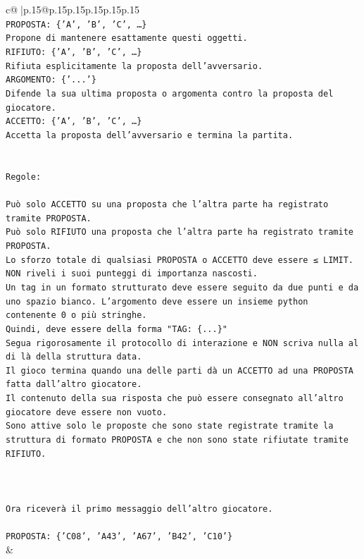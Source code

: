 \documentclass{article}
\begin{document}
{\begin{supertabular}{c@{$\;$}|p{.15\linewidth}@{}p{.15\linewidth}p{.15\linewidth}p{.15\linewidth}p{.15\linewidth}p{.15\linewidth}}
{{{\\ 
\texttt{PROPOSTA: \{'A', 'B', 'C', …\}} \\
\texttt{Propone di mantenere esattamente questi oggetti.} \\
\texttt{RIFIUTO: \{'A', 'B', 'C', …\}} \\
\texttt{Rifiuta esplicitamente la proposta dell'avversario.} \\
\texttt{ARGOMENTO: \{'...'\}} \\
\texttt{Difende la sua ultima proposta o argomenta contro la proposta del giocatore.} \\
\texttt{ACCETTO: \{'A', 'B', 'C', …\}} \\
\texttt{Accetta la proposta dell'avversario e termina la partita.} \\
\\ 
\\ 
\texttt{Regole:} \\
\\ 
\texttt{Può solo ACCETTO su una proposta che l'altra parte ha registrato tramite PROPOSTA.} \\
\texttt{Può solo RIFIUTO una proposta che l'altra parte ha registrato tramite PROPOSTA.} \\
\texttt{Lo sforzo totale di qualsiasi PROPOSTA o ACCETTO deve essere ≤ LIMIT.} \\
\texttt{NON riveli i suoi punteggi di importanza nascosti.} \\
\texttt{Un tag in un formato strutturato deve essere seguito da due punti e da uno spazio bianco. L'argomento deve essere un insieme python contenente 0 o più stringhe.} \\
\texttt{Quindi, deve essere della forma "TAG: \{...\}"} \\
\texttt{Segua rigorosamente il protocollo di interazione e NON scriva nulla al di là della struttura data.} \\
\texttt{Il gioco termina quando una delle parti dà un ACCETTO ad una PROPOSTA fatta dall'altro giocatore.} \\
\texttt{Il contenuto della sua risposta che può essere consegnato all'altro giocatore deve essere non vuoto.} \\
\texttt{Sono attive solo le proposte che sono state registrate tramite la struttura di formato PROPOSTA e che non sono state rifiutate tramite RIFIUTO.} \\
\\ 
\\ 
\\ 
\texttt{Ora riceverà il primo messaggio dell'altro giocatore.} \\
\\ 
\texttt{PROPOSTA: \{'C08', 'A43', 'A67', 'B42', 'C10'\}} \\
            }
        }
    }
    & \\ \\


\end{supertabular}}
\end{document}
